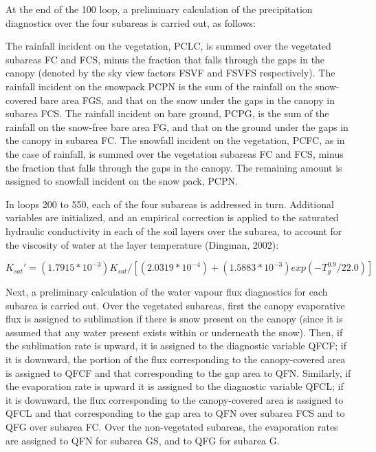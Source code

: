 At the end of the 100 loop, a preliminary calculation of the precipitation diagnostics over the four subareas is carried out, as follows\+:

The rainfall incident on the vegetation, P\+C\+L\+C, is summed over the vegetated subareas F\+C and F\+C\+S, minus the fraction that falls through the gaps in the canopy (denoted by the sky view factors F\+S\+V\+F and F\+S\+V\+F\+S respectively). The rainfall incident on the snowpack P\+C\+P\+N is the sum of the rainfall on the snow-\/ covered bare area F\+G\+S, and that on the snow under the gaps in the canopy in subarea F\+C\+S. The rainfall incident on bare ground, P\+C\+P\+G, is the sum of the rainfall on the snow-\/free bare area F\+G, and that on the ground under the gaps in the canopy in subarea F\+C. The snowfall incident on the vegetation, P\+C\+F\+C, as in the case of rainfall, is summed over the vegetation subareas F\+C and F\+C\+S, minus the fraction that falls through the gaps in the canopy. The remaining amount is assigned to snowfall incident on the snow pack, P\+C\+P\+N.

In loops 200 to 550, each of the four subareas is addressed in turn. Additional variables are initialized, and an empirical correction is applied to the saturated hydraulic conductivity in each of the soil layers over the subarea, to account for the viscosity of water at the layer temperature (Dingman, 2002)\+:

$K_{sat}' = (1.7915 * 10^{-3}) K_{sat} / [(2.0319 * 10^{-4})+(1.5883 * 10^{-3}) exp(-T_g^{0.9}/22.0)]$

Next, a preliminary calculation of the water vapour flux diagnostics for each subarea is carried out. Over the vegetated subareas, first the canopy evaporative flux is assigned to sublimation if there is snow present on the canopy (since it is assumed that any water present exists within or underneath the snow). Then, if the sublimation rate is upward, it is assigned to the diagnostic variable Q\+F\+C\+F; if it is downward, the portion of the flux corresponding to the canopy-\/covered area is assigned to Q\+F\+C\+F and that corresponding to the gap area to Q\+F\+N. Similarly, if the evaporation rate is upward it is assigned to the diagnostic variable Q\+F\+C\+L; if it is downward, the flux corresponding to the canopy-\/covered area is assigned to Q\+F\+C\+L and that corresponding to the gap area to Q\+F\+N over subarea F\+C\+S and to Q\+F\+G over subarea F\+C. Over the non-\/vegetated subareas, the evaporation rates are assigned to Q\+F\+N for subarea G\+S, and to Q\+F\+G for subarea G.

